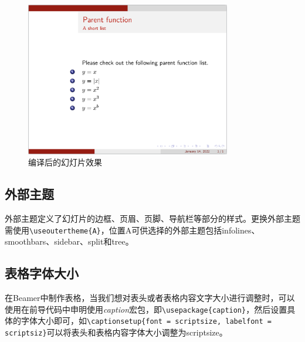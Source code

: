 \begin{figure}[htbp]
    \centering
    \includegraphics[width = 0.8\textwidth]{images/ch_9/example_innertheme_inmargin.png}
    \caption{编译后的幻灯片效果}
    \label{figeg:007}
\end{figure}

\subsection{外部主题}

外部主题定义了幻灯片的边框、页眉、页脚、导航栏等部分的样式。更换外部主题需使用\texttt{\textbackslash{}useoutertheme\{A\}}，位置A可供选择的外部主题包括infolines、smoothbars、sidebar、split和tree。

\subsection{表格字体大小}

在Beamer中制作表格，当我们想对表头或者表格内容文字大小进行调整时，可以使用在前导代码中申明使用\emph{caption}宏包，即\texttt{\textbackslash{}usepackage\{caption\}}，然后设置具体的字体大小即可，如\texttt{\textbackslash{}captionsetup\{font = scriptsize, labelfont = scriptsiz\}}可以将表头和表格内容字体大小调整为scriptsize。

